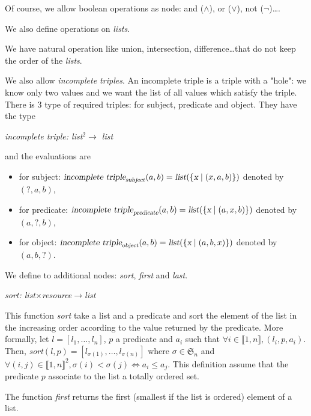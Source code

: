 Of course, we allow boolean operations as node: and ($\wedge$), or ($\vee$), not ($\neg$)\dots.

\bigskip

We also define operations on \textsl{lists}.

We have natural operation like union, intersection, difference\ldots that do not keep the order of the \textsl{lists}.

We also allow \textsl{incomplete triples}. An incomplete triple is a triple with a "hole": we know only two values and we want the list of all values which satisfy the triple. There is 3 type of required triples: for subject, predicate and object. They have the type
\begin{center}
\textsl{incomplete triple: list$^2\rightarrow$ list}
\end{center}
and the evaluations are
\begin{itemize}
    \item for subject: $\textsl{incomplete triple}_{\textsl{subject}}(a,b) = \textsl{list}(\{\textsl{x}\mid(x,a,b)\})$ denoted by $(?,a,b)$,
    \item for predicate: $\textsl{incomplete triple}_{\textsl{predicate}}(a,b) = \textsl{list}(\{\textsl{x}\mid(a,x,b)\})$ denoted by $(a,?,b)$,
    \item for object: $\textsl{incomplete triple}_{\textsl{object}}(a,b) = \textsl{list}(\{\textsl{x}\mid(a,b,x)\})$ denoted by $(a,b,?)$.
\end{itemize}

We define to additional nodes: \textsl{sort}, \textsl{first} and \textsl{last}.

\begin{center}
\textsl{sort: list$\times$resource$\rightarrow$list}
\end{center}
This function \textsl{sort} take a list and a predicate and sort the element of the list in the increasing order according to the value returned by the predicate. More formally, let $l=[l_1,\ldots,l_n]$, $p$ a predicate and $a_i$ such that $\forall i\in\llbracket1,n\rrbracket, (l_i,p,a_i)$. Then, \textsl{sort}$(l,p) = [l_{\sigma(1)},\ldots,l_{\sigma(n)}]$ where $\sigma\in\mathfrak{S}_n$ and $\forall (i,j)\in\llbracket 1,n\rrbracket^2, \sigma(i)<\sigma(j) \Leftrightarrow a_i \leqslant a_j$. This definition assume that the predicate $p$ associate to the list a totally ordered set.

The function \textsl{first} returns the first (smallest if the list is ordered) element of a list.

